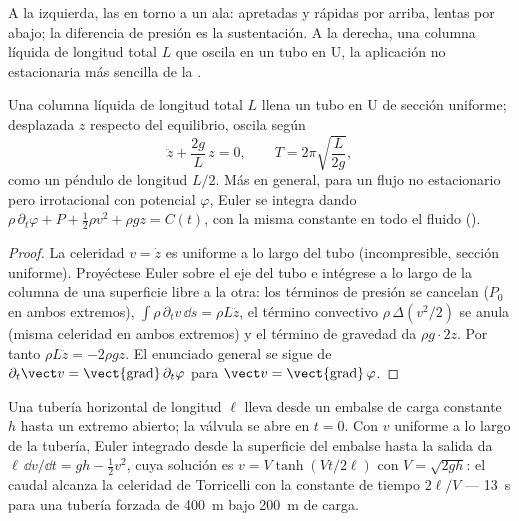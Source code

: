 \begin{omfigure}
{\small A la izquierda, las  en torno a un ala:
apretadas y rápidas por arriba, lentas por abajo; la diferencia de presión
es la sustentación. A la derecha, una columna líquida de longitud total
$L$ que oscila en un tubo en U, la aplicación no estacionaria más sencilla
de la .}
\end{omfigure}

\begin{proposition}\label{prop:b2:euler-bernoulli:utube}
Una columna líquida de longitud total $L$ llena un tubo en U de sección
uniforme; desplazada $z$ respecto del equilibrio, oscila según
\[
\ddot z + \frac{2g}{L}\,z = 0 , \qquad T = 2\pi\sqrt{\frac{L}{2g}} ,
\]
como un péndulo de longitud $L/2$. Más en general, para un flujo no
estacionario pero irrotacional con potencial $\varphi$, Euler se integra dando
$\rho\,\partial_t\varphi + P + \tfrac12\rho v^2 + \rho gz = C(t)$, con la misma
constante en todo el fluido ().
\end{proposition}

\begin{proof}
La celeridad $v = \dot z$ es uniforme a lo largo del tubo (incompresible,
sección uniforme). Proyéctese Euler sobre el eje del tubo e intégrese a lo
largo de la columna de una superficie libre a la otra: los términos de
presión se cancelan ($P_0$ en ambos extremos), $\int\rho\,\partial_tv\,\dd s = \rho L\ddot z$, el
término convectivo $\rho\,\Delta(v^2/2)$ se anula (misma celeridad en ambos extremos)
y el término de gravedad da $\rho g\cdot2z$. Por tanto $\rho L\ddot z = -2\rho gz$.
El enunciado general se sigue de $\partial_t\vect v = \operatorname{\vect{grad}}
\partial_t\varphi$ para $\vect v = \operatorname{\vect{grad}}\varphi$.
\end{proof}

\begin{example}\label{ex:b2:euler-bernoulli:start}
Una tubería horizontal de longitud $\ell$ lleva desde un embalse de carga
constante $h$ hasta un extremo abierto; la válvula se abre en $t = 0$. Con
$v$ uniforme a lo largo de la tubería, Euler integrado desde la superficie
del embalse hasta la salida da $\ell\,\dd v/\dd t = gh - \tfrac12v^2$, cuya solución es
$v = V\tanh(Vt/2\ell)$ con $V = \sqrt{2gh}$: el caudal alcanza la celeridad
de Torricelli con la constante de tiempo $2\ell/V$ --- \qty{13}{s} para una
tubería forzada de \qty{400}{m} bajo \qty{200}{m} de carga.
\end{example}

